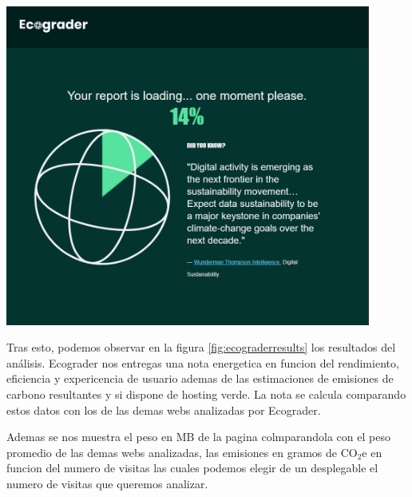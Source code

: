 \documentclass[12pt,a4paper]{report}
\begin{document}
\begin{center}
  \includegraphics[width=0.9\textwidth]{imagenes/Ecograder_1.png}
  \label{fig:ecograderload}
\end{center}

Tras esto, podemos observar en la figura \ref{fig:ecograderresults} los resultados del análisis.
Ecograder nos entregas una nota energetica en funcion del rendimiento, eficiencia y expericencia de usuario
ademas de las estimaciones de emisiones de carbono resultantes y si dispone de hosting verde.
La nota se calcula comparando estos datos con los de las demas webs analizadas por Ecograder.

Ademas se nos muestra el peso en MB de la pagina colmparandola con el peso promedio de las demas webs analizadas,
 las emisiones en gramos de CO$_2$e en funcion del numero de visitas las cuales podemos elegir de un desplegable el numero 
 de visitas que queremos analizar.
\end{document}
